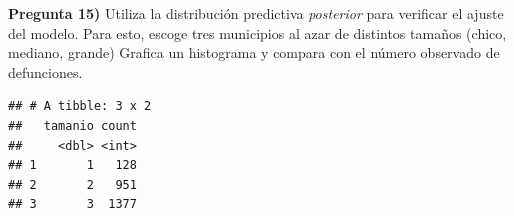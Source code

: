 \documentclass[
]{article}
\newenvironment{Shaded}{\begin{snugshade}}{\end{snugshade}}
\newcommand{\DataTypeTok}[1]{\textcolor[rgb]{0.13,0.29,0.53}{#1}}
\newcommand{\DecValTok}[1]{\textcolor[rgb]{0.00,0.00,0.81}{#1}}
\newcommand{\KeywordTok}[1]{\textcolor[rgb]{0.13,0.29,0.53}{\textbf{#1}}}
\newcommand{\NormalTok}[1]{#1}
\newcommand{\OperatorTok}[1]{\textcolor[rgb]{0.81,0.36,0.00}{\textbf{#1}}}
\newcommand{\StringTok}[1]{\textcolor[rgb]{0.31,0.60,0.02}{#1}}
\begin{document}
\textbf{Pregunta 15)} Utiliza la distribución predictiva
\emph{posterior} para verificar el ajuste del modelo. Para esto, escoge
tres municipios al azar de distintos tamaños (chico, mediano, grande)
Grafica un histograma y compara con el número observado de defunciones.

\begin{Shaded}
\end{Shaded}

\begin{verbatim}
## # A tibble: 3 x 2
##   tamanio count
##     <dbl> <int>
## 1       1   128
## 2       2   951
## 3       3  1377
\end{verbatim}
\end{document}
